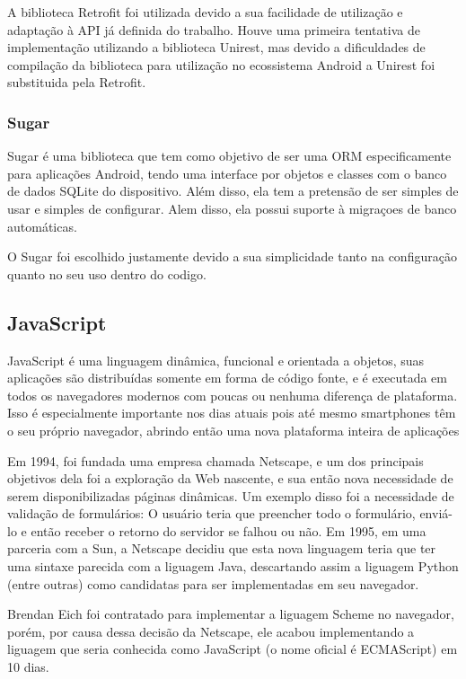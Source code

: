 \documentclass[
	article,			%
	11pt,				%
	oneside,			%
	a4paper,			%
	english,			%
	brazil,				%
	sumario=tradicional
	]{abntex2}
\begin{document}
A biblioteca Retrofit foi utilizada devido a sua facilidade de utilização e
adaptação à API já definida do trabalho. Houve uma primeira tentativa de
implementação utilizando a biblioteca Unirest, mas devido a dificuldades de
compilação da biblioteca para utilização no ecossistema Android a Unirest foi
substituida pela Retrofit.

\subsubsection{Sugar}

Sugar é uma biblioteca que tem como objetivo de ser uma ORM especificamente para
aplicações Android, tendo uma interface por objetos e classes com o banco de dados
SQLite do dispositivo. Além disso, ela tem a pretensão de ser simples de usar e
simples de configurar. Alem disso, ela possui suporte à migraçoes de banco
automáticas.\cite{sugar}

O Sugar foi escolhido justamente devido a sua simplicidade tanto na configuração
quanto no seu uso dentro do codigo.

\subsection{JavaScript}

JavaScript é uma linguagem dinâmica, funcional e orientada a objetos, suas
aplicações são distribuídas somente em forma de código fonte, e é executada em
todos os navegadores modernos com poucas ou nenhuma diferença de plataforma.
Isso é especialmente importante nos dias atuais pois até mesmo smartphones têm
o seu próprio navegador, abrindo então uma nova plataforma inteira de aplicações

Em 1994, foi fundada uma empresa chamada Netscape, e um dos principais objetivos
dela foi a exploração da Web nascente, e sua então nova necessidade de serem
disponibilizadas páginas dinâmicas. Um exemplo disso foi a necessidade de
validação de formulários: O usuário teria que preencher todo o formulário,
enviá-lo e então receber o retorno do servidor se falhou ou não. Em 1995, em uma
parceria com a Sun, a Netscape decidiu que esta nova linguagem teria que ter uma
sintaxe parecida com a liguagem Java, descartando assim a liguagem Python
(entre outras) como candidatas para ser implementadas em seu navegador.

Brendan Eich foi contratado para implementar a liguagem Scheme no navegador,
porém, por causa dessa decisão da Netscape, ele acabou implementando a liguagem
que seria conhecida como JavaScript (o nome oficial é ECMAScript) em 10 dias. \cite{javascript}
\end{document}
